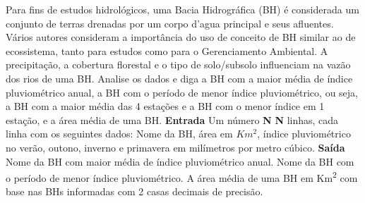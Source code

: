 \documentclass[a4paper, 12pt]{article}
\begin{document}
Para fins de estudos hidrológicos, uma Bacia Hidrográfica (BH) é considerada um conjunto de terras drenadas por um corpo d’agua principal e seus afluentes. Vários autores consideram a importância do uso de conceito de BH similar ao de ecossistema, tanto para estudos como para o Gerenciamento Ambiental. A precipitação, a cobertura florestal e o tipo de solo/subsolo influenciam na vazão dos rios de uma BH. Analise os dados e diga a BH com a maior média de índice pluviométrico anual, a BH com o período de menor índice pluviométrico, ou seja, a BH com a maior média das 4 estações e a BH com o menor índice em 1 estação, e a área média de uma BH.
\newline \newline
\textbf{{\large Entrada}} \newline
Um número \textbf{N} \newline
\textbf{N} linhas, cada linha com os seguintes dados:\newline
Nome da BH, área em $Km^2$, índice pluviométrico no verão, outono, inverno e primavera em milímetros por metro cúbico.
\newline \newline
\textbf{{\large Saída}} \newline
Nome da BH com maior média de índice pluviométrico anual.\newline
Nome da BH com o período de menor índice pluviométrico.\newline
A área média de uma BH em Km\textsuperscript{2} com base nas BHs informadas com 2 casas decimais de precisão.
\newline \newline
\newline
\end{document}
